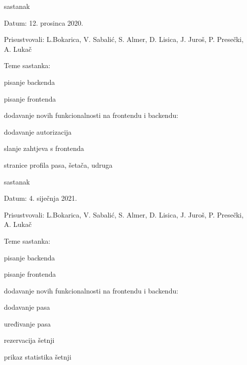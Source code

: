 \begin{packed_enum}
				\item  sastanak
			\item[] \begin{packed_item}
				\item Datum: 12. prosinca 2020.
				\item Prisustvovali: L.Bokarica, V. Sabalić, S. Almer, D. Lisica, J. Juroš, P. Presečki, A. Lukač
				\item Teme sastanka:
				\begin{packed_item}
					\item  pisanje backenda
					\item pisanje frontenda
					\item dodavanje novih funkcionalnosti na frontendu i backendu:
					\begin{packed_item}
						\item dodavanje autorizacija
						\item slanje zahtjeva s frontenda
						\item stranice profila pasa, šetača, udruga
					\end{packed_item}	
				\end{packed_item}
			\end{packed_item}
				\item sastanak
				\item[] \begin{packed_item}
				\item Datum: 4. siječnja 2021.
				\item Prisustvovali: L.Bokarica, V. Sabalić, S. Almer, D. Lisica, J. Juroš, P. Presečki, A. Lukač
				\item Teme sastanka:
				\begin{packed_item}
					\item  pisanje backenda
					\item pisanje frontenda
					\item dodavanje novih funkcionalnosti na frontendu i backendu:
					\begin{packed_item}
						\item dodavanje pasa
						\item uređivanje pasa
						\item rezervacija šetnji
						\item prikaz statistika šetnji
					\end{packed_item}	
				\end{packed_item}
			\end{packed_item}
			
			
		\end{packed_enum}
		
